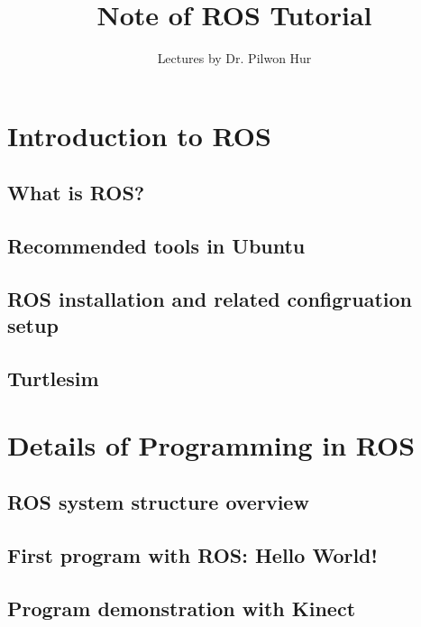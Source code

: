 \documentclass{article}
\title{Note of ROS Tutorial}
\author{Lectures by Dr. Pilwon Hur}
\begin{document}
\maketitle
\section{Introduction to ROS}
\subsection{What is ROS?}
\subsection{Recommended tools in Ubuntu}
\subsection{ROS installation and related configruation setup}
\subsection{Turtlesim}
\section{Details of Programming in ROS}
\subsection{ROS system structure overview}
\subsection{First program with ROS: Hello World!}
\subsection{Program demonstration with Kinect}





%
\end{document}
